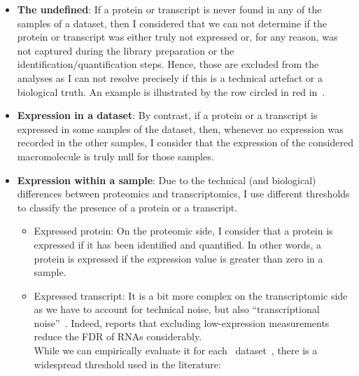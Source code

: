 \begin{itemize}
        \item\textbf{The undefined}:\label{subsec:ExpressedOrNot-undefined} %
        If a protein or transcript is never found in any of the samples of a dataset,
        then I considered that we can not determine if the protein or transcript was
        either truly not expressed or, for any reason, was not captured during the library
        preparation or the identification/quantification steps. Hence, those are
        excluded from the analyses as I can not resolve precisely if this is a
        technical artefact or a biological truth. An example is illustrated by the row
        circled in red in~.
        \item\textbf{Expression in a dataset}:\label{subsec:ExpressedOrNot--expDataset} %
        By contrast, if a protein or a transcript is expressed in some samples of the
        dataset, then, whenever no expression was recorded in the other
        samples, I consider that the expression of the considered macromolecule is truly
        null for those samples.
        \item\textbf{Expression within a sample}:
        Due to the technical (and biological) differences between proteomics and
        transcriptomics, I use different thresholds to classify the presence of
        a protein or a transcript.
        \begin{itemize}
                \item\textsf{Expressed protein}:
                On the proteomic side, I consider that a protein is expressed
                if it has been identified and quantified.
                In other words, a protein is expressed
                if the expression value is greater than zero in a sample.
                \item\textsf{Expressed transcript}:\label{subsubsec:exprTrans} %
                It is a bit more complex on the transcriptomic side as
                we have to account for technical noise,
                but also \enquote{transcriptional noise}~.
                Indeed, \citet{seqcmaqc} reports that
                excluding low-expression measurements reduce the \gls{FDR}
                of \glspl{RNA} considerably.\\
                While we can empirically evaluate it for each \Rnaseq\
                dataset~,
                there is a widespread threshold used in the literature:

\end{itemize}
\end{itemize}
